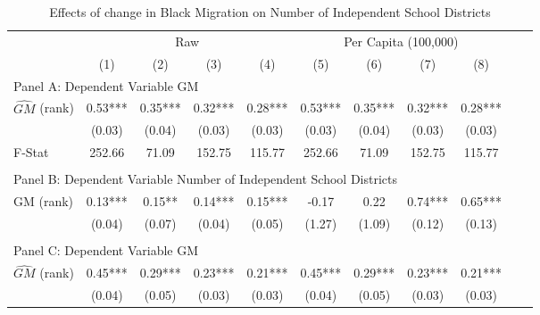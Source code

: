  \begin{table}[htbp]\centering {} \begin{threeparttable} \caption{Effects of change in Black Migration on Number of Independent School Districts} \begin{tabular}{l*{10}{c}} \toprule
                &\multicolumn{4}{c}{Raw}                                    &\multicolumn{4}{c}{Per Capita (100,000)}                   \\\cmidrule(lr){2-5}\cmidrule(lr){6-9}
                &\multicolumn{1}{c}{(1)}   &\multicolumn{1}{c}{(2)}   &\multicolumn{1}{c}{(3)}   &\multicolumn{1}{c}{(4)}   &\multicolumn{1}{c}{(5)}   &\multicolumn{1}{c}{(6)}   &\multicolumn{1}{c}{(7)}   &\multicolumn{1}{c}{(8)}   \\
\cmidrule(lr){1-9}
\multicolumn{8}{l}{Panel A: Dependent Variable GM}\\
\cmidrule(lr){1-9}
$\hat{GM}$ (rank)&       0.53***&       0.35***&       0.32***&       0.28***&       0.53***&       0.35***&       0.32***&       0.28***\\
                &     (0.03)   &     (0.04)   &     (0.03)   &     (0.03)   &     (0.03)   &     (0.04)   &     (0.03)   &     (0.03)   \\
\midrule
F-Stat          &     252.66   &      71.09   &     152.75   &     115.77   &     252.66   &      71.09   &     152.75   &     115.77   \\
\cmidrule[\heavyrulewidth](lr){1-9} \\ \cmidrule[\heavyrulewidth](lr){1-9}
\multicolumn{8}{l}{Panel B: Dependent Variable Number of Independent School Districts}\\
\cmidrule(lr){1-9}
GM  (rank)      &       0.13***&       0.15** &       0.14***&       0.15***&      -0.17   &       0.22   &       0.74***&       0.65***\\
                &     (0.04)   &     (0.07)   &     (0.04)   &     (0.05)   &     (1.27)   &     (1.09)   &     (0.12)   &     (0.13)   \\
\cmidrule[\heavyrulewidth](lr){1-9} \\ \cmidrule[\heavyrulewidth](lr){1-9}
\multicolumn{8}{l}{Panel C: Dependent Variable GM}\\
\cmidrule(lr){1-9}
$\hat{GM}$ (rank)&       0.45***&       0.29***&       0.23***&       0.21***&       0.45***&       0.29***&       0.23***&       0.21***\\
                &     (0.04)   &     (0.05)   &     (0.03)   &     (0.03)   &     (0.04)   &     (0.05)   &     (0.03)   &     (0.03)   \\

\end{tabular}
\end{threeparttable}
\end{table}
